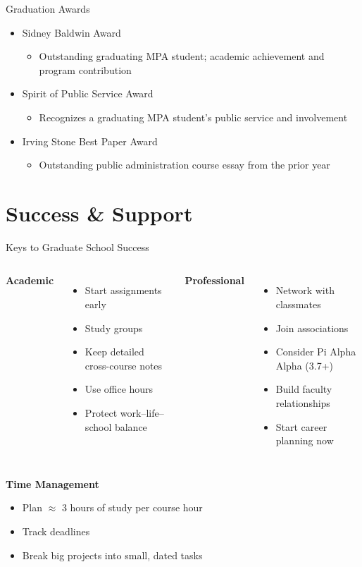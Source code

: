 \documentclass[10pt,aspectratio=169]{beamer}
\begin{document}
\begin{frame}{Graduation Awards}
\large
\begin{itemize}
  \item Sidney Baldwin Award
    \begin{itemize}
      \item Outstanding graduating MPA student; academic achievement and program contribution
    \end{itemize}
  \item Spirit of Public Service Award
    \begin{itemize}
      \item Recognizes a graduating MPA student's public service and involvement
    \end{itemize}
  \item Irving Stone Best Paper Award
    \begin{itemize}
      \item Outstanding public administration course essay from the prior year
    \end{itemize}
\end{itemize}
\end{frame}

\section{\textcolor{titanorange}{Success \& Support}}
\begin{frame}{Keys to Graduate School Success}
\begin{columns}[T,onlytextwidth]
  \textbf{Academic}
  \begin{itemize}
    \item Start assignments early
    \item Study groups
    \item Keep detailed cross-course notes
    \item Use office hours
    \item Protect work--life--school balance
  \end{itemize}
  \textbf{Professional}
  \begin{itemize}
    \item Network with classmates
    \item Join associations
    \item Consider Pi Alpha Alpha (3.7+)
    \item Build faculty relationships
    \item Start career planning now
  \end{itemize}
\end{columns}

\vspace{0.4em}
\textbf{Time Management}
\begin{itemize}
  \item Plan \(\approx\) 3 hours of study per course hour
  \item Track deadlines
  \item Break big projects into small, dated tasks
\end{itemize}
\end{frame}
\end{document}
